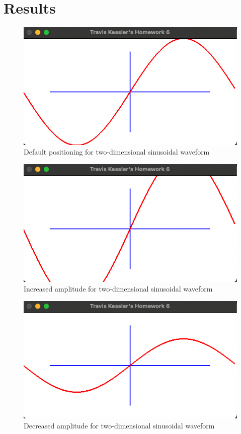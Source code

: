 \documentclass{report}
\begin{document}
	\section*{Results}
	
	\begin{figure}[!ht]
		\centering
		\includegraphics[scale=0.7, trim={0 0.05cm 0 0.0cm}, clip]{figures/2d_base.png}
		\caption{Default positioning for two-dimensional sinusoidal waveform}
	\end{figure}

	\begin{figure}[!ht]
		\centering
		\includegraphics[scale=0.7, trim={0 0.05cm 0 0.0cm}, clip]{figures/2d_u.png}
		\caption{Increased amplitude for two-dimensional sinusoidal waveform}
	\end{figure}

	\begin{figure}[!ht]
		\centering
		\includegraphics[scale=0.7, trim={0 0.05cm 0 0.0cm}, clip]{figures/2d_d.png}
		\caption{Decreased amplitude for two-dimensional sinusoidal waveform}
	\end{figure}
\end{document}

